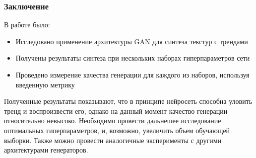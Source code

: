 \documentclass[9pt]{beamer}
\begin{document}
\begin{frame}\frametitle{Заключение}
	В работе было:
	\begin{itemize}
		\item Исследовано применение архитектуры GAN для синтеза текстур с трендами
		\item Получены результаты синтеза при нескольких наборах гиперпараметров сети
		\item Проведено измерение качества генерации для каждого из наборов, используя введенную метрику
	\end{itemize}
	Полученные результаты показывают, что в принципе нейросеть способна уловить тренд и воспроизвести его, однако на данный момент качество генерации относительно невысоко. Необходимо провести дальнешее исследование оптимальных гиперпараметров, и, возможно, увеличить объем обучающей выборки. Также можно провести аналогичные эксперименты с другими архитектурами генераторов.
\end{frame}
\end{document}
